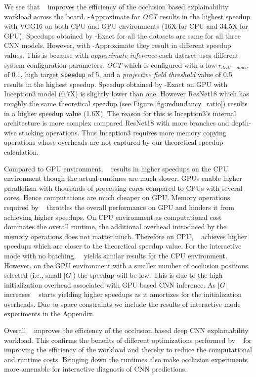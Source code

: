 We see that \system~ improves the efficiency of the occlusion based explainability workload across the board.
\system-Approximate for \textit{OCT} results in the highest speedup with VGG16 on both CPU and GPU environments (16X for CPU and 34.5X for GPU).
Speedups obtained by \system-Exact for all the datasets are same for all three CNN models.
However, with \system-Approximate they result in different speedup values.
This is because with \textit{approximate inference} each dataset uses different system configuration parameters.
\textit{OCT} which is configured with a low $r_{drill-down}$ of 0.1, high target \texttt{speedup} of 5, and a \textit{projective field threshold} value of 0.5 results in the highest speedup.
Speedup obtained by \system-Exact on GPU with Inception3 model (0.7X) is slightly lower than one.
However ResNet18 which has roughly the same theoretical speedup (see Figure \ref{fig:redundancy_ratio}) results in a higher speedup value (1.6X).
The reason for this is Inception3's internal architecture is more complex compared ResNet18 with more branches and depth-wise stacking operations.
Thus Inception3 requires more memory copying operations whose overheads are not captured by our theoretical speedup calculation.

Compared to GPU environment, \system~ results in higher speedups on the CPU environment though the actual runtimes are much slower.
GPUs enable higher parallelism with thousands of processing cores compared to CPUs with several cores.
Hence computations are much cheaper on GPU.
Memory operations required by \system~ throttles the overall performance on GPU and hinders it from achieving higher speedups.
On CPU environment as computational cost dominates the overall runtime, the additional overhead introduced by the memory operations does not matter much.
Therefore on CPU, \system~ achieves higher speedups which are closer to the theoretical speedup value.
For the interactive mode with no batching, \system~ yields similar results for the CPU environment.
However, on the GPU environment with a smaller number of occlusion positions selected (i.e., small $|G|$) the speedup will be low.
This is due to the high initialization overhead associated with GPU based CNN inference.
As $|G|$ increases \system~ starts yielding higher speedups as it amortizes for the initialization overheads.
Due to space constraints we include the results of interactive mode experiments in the Appendix.


Overall \system~ improves the efficiency of the occlusion based deep CNN explainability workload.
This confirms the benefits of different optimizations performed by \system~ for improving the efficiency of the workload and thereby to reduce the computational and runtime costs.
Bringing down the runtimes also make occlusion experiments more amenable for interactive diagnosis of CNN predictions.


